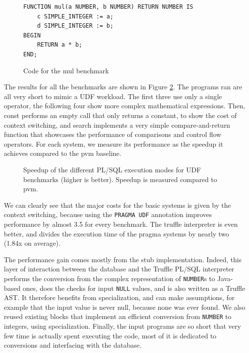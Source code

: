 \documentclass[twoside,11pt,a4paper]{article}
\newcommand{\pls}[1]{\texttt{#1}}
\newcommand{\plstype}[1]{\pls{#1}}
\newcommand{\oranum}{\plstype{NUMBER}}
\newcommand{\plsnull}{\pls{NULL}}
\newcommand{\benchsystem}[1]{\textsf{#1}}
\newcommand{\pvm}{\benchsystem{pvm}}
\newcommand{\truffle}{\benchsystem{truffle}}
\newcommand{\bench}[1]{\textsf{#1}}
\begin{document}
\begin{figure}[hbt]
	\begin{lstlisting}[style=PLSQL, frame=L]
FUNCTION mul(a NUMBER, b NUMBER) RETURN NUMBER IS
	c SIMPLE_INTEGER := a;
	d SIMPLE_INTEGER := b;
BEGIN
	RETURN a * b;
END;
	\end{lstlisting}
	\caption{Code for the \bench{mul} benchmark}
	\label{fig:mulbench}
\end{figure}

The results for all the benchmarks are shown in Figure \ref{fig:exp1a}. The programs ran are all very short to mimic a UDF workload. The first three use only a single operator, the following four show more complex mathematical expressions. Then, \bench{const} performs an empty call that only returns a constant, to show the cost of context switching, and \bench{search} implements a very simple compare-and-return function that showcases the performance of comparisons and control flow operators. For each system, we measure its performance as the speedup it achieves compared to the \pvm{} baseline.

\begin{figure}[tp]
	\centering
	\caption{Speedup of the different PL/SQL execution modes for UDF benchmarks (higher is better). Speedup is measured compared to \pvm{}.}
	\label{fig:exp1a}
\end{figure}

We can clearly see that the major costs for the basic systems is given by the context switching, because using the \pls{PRAGMA UDF} annotation improves performance by almost 3.5 for every benchmark. The \truffle{} interpreter is even better, and divides the execution time of the \benchsystem{pragma} systems by nearly two (1.84x on average).

The performance gain comes mostly from the stub implementation. Indeed, this layer of interaction between the database and the Truffle PL/SQL interpreter performs the conversion from the complex representation of \oranum{}s to Java-based ones, does the checks for input \plsnull{} values, and is also written as a Truffle AST. It therefore benefits from specialization, and can make assumptions, for example that the input value is never null, because none was ever found. We also reused existing blocks that implement an efficient conversion from \oranum{} to integers, using specialization. Finally, the input programs are so short that very few time is actually spent executing the code, most of it is dedicated to conversions and interfacing with the database.
\end{document}
